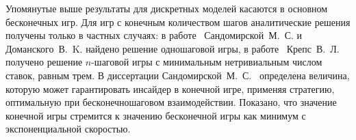 Упомянутые выше результаты для дискретных моделей касаются в основном бесконечных игр.
Для игр с конечным количеством шагов аналитические решения получены только в частных случаях: в работе~\cite{sandomirskaya12} Сандомирской~М.~С. и Доманского~В.~K. найдено решение одношаговой игры, в работе~\cite{kreps09} Крепс~В.~Л. получено решение $n$-шаговой игры с минимальным нетривиальным числом ставок, равным трем.
В диссертации Сандомирской~М.~С.~\cite{phd:sandomirskaya} определена величина, которую может гарантировать инсайдер в конечной игре, применяя стратегию, оптимальную при бесконечношаговом взаимодействии.
Показано, что значение конечной игры стремится к значению бесконечной игры как минимум с экспоненциальной скоростью.

